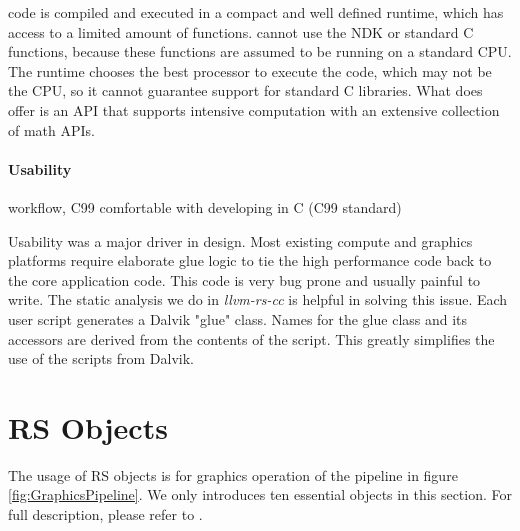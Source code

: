 \RS{} code is compiled and executed in a compact and well defined runtime, which has access to a limited amount of functions. \RS{} cannot use the NDK or standard C functions, because these functions are assumed to be running on a standard CPU. The \RS{} runtime chooses the best processor to execute the code, which may not be the CPU, so it cannot guarantee support for standard C libraries. What \RS{} does offer is an API that supports intensive computation with an extensive collection of math APIs. 

\paragraph{Usability} workflow, C99
 comfortable with developing in C (C99 standard) 

Usability was a major driver in \RS{} design. Most existing compute and graphics platforms require elaborate glue logic to tie the high performance code back to the core application code. This code is very bug prone and usually painful to write. The static analysis we do in \textit{llvm-rs-cc} is helpful in solving this issue. Each user script generates a Dalvik "glue" class. Names for the glue class and its accessors are derived from the contents of the script. This greatly simplifies the use of the scripts from Dalvik.



\section{RS Objects}
\label{s:RSObject}
The usage of RS objects is for graphics operation of the pipeline in figure \ref{fig:GraphicsPipeline}. We only introduces ten essential objects in this section. For full description, please refer to \cite{package-summary}.

